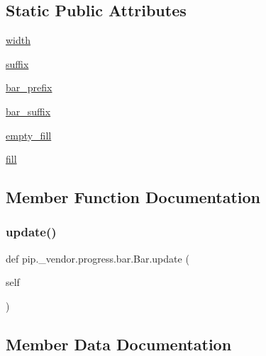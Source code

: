 \subsection*{Static Public Attributes}
\begin{DoxyCompactItemize}
\item 
\hyperlink{classpip_1_1__vendor_1_1progress_1_1bar_1_1Bar_a66be672a4f1bff0e652405eecfb12597}{width}
\item 
\hyperlink{classpip_1_1__vendor_1_1progress_1_1bar_1_1Bar_a6cb4ea8375966c5c8eb0f885b85ec64a}{suffix}
\item 
\hyperlink{classpip_1_1__vendor_1_1progress_1_1bar_1_1Bar_a34d20a18fef4aa5b0a478e72562d9973}{bar\+\_\+prefix}
\item 
\hyperlink{classpip_1_1__vendor_1_1progress_1_1bar_1_1Bar_add59db96163d08e48333ba2087ae857c}{bar\+\_\+suffix}
\item 
\hyperlink{classpip_1_1__vendor_1_1progress_1_1bar_1_1Bar_a38c2768e7d4566e840d44dae90335412}{empty\+\_\+fill}
\item 
\hyperlink{classpip_1_1__vendor_1_1progress_1_1bar_1_1Bar_a3dbd48294869a523be292f36c71b05aa}{fill}
\end{DoxyCompactItemize}


\subsection{Member Function Documentation}
\mbox{\label{classpip_1_1__vendor_1_1progress_1_1bar_1_1Bar_a8ce0fc733c1eb071d5e46991bd8d6dbf}} 
\subsubsection{\texorpdfstring{update()}{update()}}
{\footnotesize\ttfamily def pip.\+\_\+vendor.\+progress.\+bar.\+Bar.\+update (\begin{DoxyParamCaption}\item[{}]{self }\end{DoxyParamCaption})}



\subsection{Member Data Documentation}
\mbox{\label{classpip_1_1__vendor_1_1progress_1_1bar_1_1Bar_a34d20a18fef4aa5b0a478e72562d9973}} 
